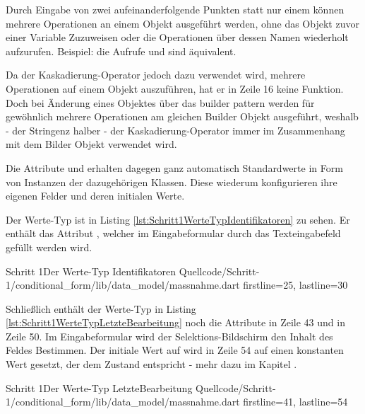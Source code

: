 Durch Eingabe von zwei aufeinanderfolgende Punkten  statt nur einem  können mehrere Operationen an einem Objekt ausgeführt werden, ohne  das Objekt zuvor einer Variable Zuzuweisen oder die Operationen über dessen Namen wiederholt aufzurufen. Beispiel: die Aufrufe   und  sind äquivalent.

Da der Kaskadierung-Operator jedoch dazu verwendet wird, mehrere Operationen auf einem Objekt auszuführen, hat er in Zeile 16 keine Funktion.
Doch bei Änderung eines Objektes über das builder pattern werden für gewöhnlich mehrere Operationen am gleichen Builder Objekt ausgeführt, weshalb - der Stringenz halber - der Kaskadierung-Operator immer  im Zusammenhang mit dem Bilder Objekt verwendet wird.

Die Attribute  und   erhalten dagegen ganz automatisch Standardwerte in Form von Instanzen der dazugehörigen Klassen.
Diese wiederum konfigurieren ihre eigenen Felder und deren initialen Werte.



Der Werte-Typ  ist in Listing \ref{lst:Schritt1WerteTypIdentifikatoren} zu sehen.
Er enthält das Attribut , welcher im Eingabeformular durch das Texteingabefeld gefüllt werden wird.

\begin{alexlisting}{Schritt 1}{Der Werte-Typ Identifikatoren}
  {Quellcode/Schritt-1/conditional_form/lib/data_model/massnahme.dart}
  {firstline=25, lastline=30}
  \label{lst:Schritt1WerteTypIdentifikatoren}
\end{alexlisting}

Schließlich enthält der Werte-Typ  in Listing \ref{lst:Schritt1WerteTypLetzteBearbeitung} noch die Attribute  in Zeile 43 und  in Zeile 50.
Im Eingabeformular wird der Selektions-Bildschirm den Inhalt des Feldes  Bestimmen.
Der initiale Wert auf wird in Zeile 54 auf einen konstanten Wert gesetzt, der dem Zustand  entspricht - mehr dazu im Kapitel .

\begin{alexlisting}{Schritt 1}{Der Werte-Typ LetzteBearbeitung}
  {Quellcode/Schritt-1/conditional_form/lib/data_model/massnahme.dart}
  {firstline=41, lastline=54}
  \label{lst:Schritt1WerteTypLetzteBearbeitung}
\end{alexlisting}

